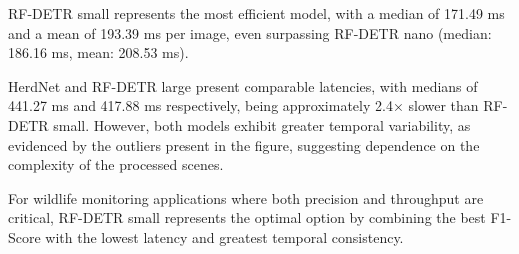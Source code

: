 RF-DETR small represents the most efficient model, with a median of 171.49 ms and a mean of 193.39 ms per image, even surpassing RF-DETR nano (median: 186.16 ms, mean: 208.53 ms).

HerdNet and RF-DETR large present comparable latencies, with medians of 441.27 ms and 417.88 ms respectively, being approximately 2.4× slower than RF-DETR small. However, both models exhibit greater temporal variability, as evidenced by the outliers present in the figure, suggesting dependence on the complexity of the processed scenes.

For wildlife monitoring applications where both precision and throughput are critical, RF-DETR small represents the optimal option by combining the best F1-Score with the lowest latency and greatest temporal consistency.

%
%
%
%
%
%
